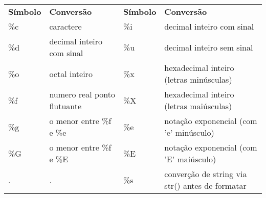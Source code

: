 \documentclass[landscape,a0paper,fontscale=0.285]{baposter} %
\begin{document}
\begin{poster}
{%
\colorbox[HTML]{CCFFFF}{}
\begin{tabular}{ll|ll} %
{\bf Símbolo} & {\bf Conversão} & {\bf Símbolo} & {\bf Conversão} \\
\%c & caractere					& \%i & decimal inteiro com sinal \\
\%d & decimal inteiro com sinal	& \%u & decimal inteiro sem sinal \\
\%o & octal inteiro				& \%x & hexadecimal inteiro (letras minúsculas) \\
\%f & numero real ponto flutuante & \%X & hexadecimal inteiro (letras maiúsculas) \\
\%g & o menor entre \%f e \%e & \%e & notação exponencial (com 'e' minúsculo) \\
\%G & o menor entre \%f e \%E & \%E & notação exponencial (com 'E' maiúsculo) \\
. & . & \%s & converção de string via str() antes de formatar \\
\end{tabular}

}
\end{poster}
\end{document}
